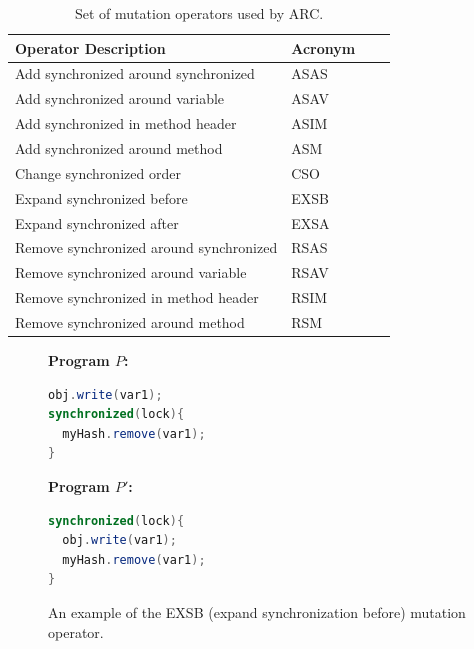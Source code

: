 \begin{table}[t!]
\caption{Set of mutation operators used by ARC.}
\begin{center}
\begin{tabular}{|l|l|c|c|}
\hline
\textbf{Operator Description} & \textbf{Acronym} \\
\hline
Add synchronized around synchronized & ASAS \\
\hline
Add synchronized around variable & ASAV \\
\hline
Add synchronized in method header & ASIM \\
\hline
Add synchronized around method & ASM  \\
\hline
Change synchronized order & CSO  \\
\hline
Expand synchronized before & EXSB  \\
\hline
Expand synchronized after & EXSA  \\
\hline
Remove synchronized around synchronized & RSAS  \\
\hline
Remove synchronized around variable & RSAV  \\
\hline
Remove synchronized in method header & RSIM  \\
\hline
Remove synchronized around method & RSM  \\
\hline
\end{tabular}
\label{tbl:operators}
\end{center}
\end{table}

\begin{figure}[t!]
\vspace{2mm}
\begin{minipage}{5cm}

\footnotesize{\textbf{ Program $P$:}}
\begin{lstlisting}[language=Java, morekeywords={synchronize}]
obj.write(var1);
synchronized(lock){
  myHash.remove(var1);
}
\end{lstlisting}
\end{minipage}\hfill
\begin{minipage}{5cm}
\footnotesize{\textbf{ Program $P'$:}}
\begin{lstlisting}[language=Java, morekeywords={synchronize}]
synchronized(lock){
  obj.write(var1);
  myHash.remove(var1);
}
\end{lstlisting}
\end{minipage}

\caption{An example of the EXSB (expand synchronization before) mutation
operator.}
\label{fig:EXSB_example}
\end{figure}

